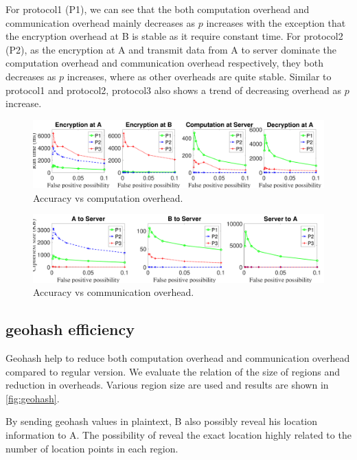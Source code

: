 For protocol1 (P1), we can see that the both computation overhead and communication overhead mainly decreases as $p$ increases with the exception that the encryption overhead at B is stable as it require constant time. For protocol2 (P2), as the encryption at A and transmit data from A to server dominate the computation overhead and communication overhead respectively, they both decreases as $p$ increases, where as other overheads are quite stable. Similar to protocol1 and protocol2, protocol3 also shows a trend of decreasing overhead as $p$ increase.

\begin{figure}[h]
    \centering
    \includegraphics[width=\linewidth]{figures/accuracy_comp.pdf}
    \caption{Accuracy vs computation overhead.}
    \label{fig:accuracy_comp}
\end{figure}


\begin{figure}[h]
    \centering
    \includegraphics[width=\linewidth]{figures/accuracy_comm.pdf}
    \caption{Accuracy vs communication overhead.}
    \label{fig:accuracy_comm}
\end{figure}

\subsection{geohash efficiency}
Geohash help to reduce both computation overhead and communication overhead compared to regular version. We evaluate the relation of the size of regions and reduction in overheads. Various region size are used and results are shown in \autoref{fig:geohash}.

By sending geohash values in plaintext, B also possibly reveal his location information to A. The possibility of reveal the exact location highly related to the number of location points in each region.

